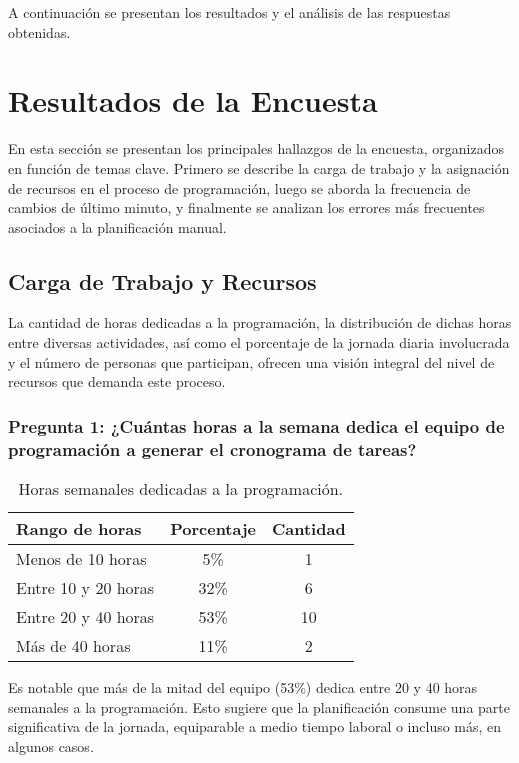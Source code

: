 \documentclass{article}
\begin{document}
A continuación se presentan los resultados y el análisis de las respuestas obtenidas.

\section*{Resultados de la Encuesta}

En esta sección se presentan los principales hallazgos de la encuesta, organizados en función de temas clave. Primero se describe la carga de trabajo y la asignación de recursos en el proceso de programación, luego se aborda la frecuencia de cambios de último minuto, y finalmente se analizan los errores más frecuentes asociados a la planificación manual.

\subsection*{Carga de Trabajo y Recursos}

La cantidad de horas dedicadas a la programación, la distribución de dichas horas entre diversas actividades, así como el porcentaje de la jornada diaria involucrada y el número de personas que participan, ofrecen una visión integral del nivel de recursos que demanda este proceso.

\subsubsection*{Pregunta 1: ¿Cuántas horas a la semana dedica el equipo de programación a generar el cronograma de tareas?}



\begin{table}[H]
    \centering
    \begin{tabular}{lcc}
        \toprule
        \textbf{Rango de horas} & \textbf{Porcentaje} & \textbf{Cantidad} \\
        \midrule
        Menos de 10 horas & 5\% & 1 \\
        Entre 10 y 20 horas & 32\% & 6 \\
        Entre 20 y 40 horas & 53\% & 10 \\
        Más de 40 horas & 11\% & 2 \\
        \bottomrule
    \end{tabular}
    \caption{Horas semanales dedicadas a la programación.}
    \label{tab:horas_semanales}
\end{table}

Es notable que más de la mitad del equipo (53\%) dedica entre 20 y 40 horas semanales a la programación. Esto sugiere que la planificación consume una parte significativa de la jornada, equiparable a medio tiempo laboral o incluso más, en algunos casos.
\end{document}
